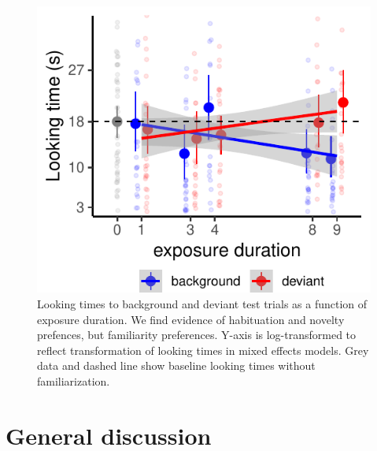 \documentclass[10pt, letterpaper]{article}
\newenvironment{CodeChunk}{}{}
\begin{document}
\captionsetup{belowskip=2pt,aboveskip=4pt}

\begin{CodeChunk}
\begin{figure}[h]

\includegraphics{figs/infant_results-1} \hfill{}

\caption[Looking times to background and deviant test trials as a function of exposure duration]{Looking times to background and deviant test trials as a function of exposure duration. We find evidence of habituation and novelty prefences, but familiarity preferences. Y-axis is log-transformed to reflect transformation of looking times in mixed effects models. Grey data and dashed line show baseline looking times without familiarization.}\label{fig:infant_results}
\end{figure}
\end{CodeChunk}

\hypertarget{general-discussion}{%
\section{General discussion}\label{general-discussion}}
\end{document}

